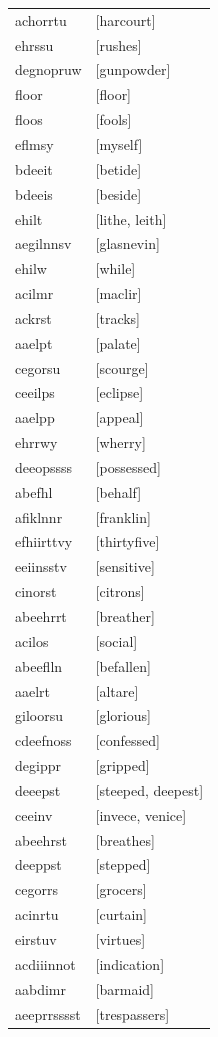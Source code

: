 \documentclass{article}
\begin{document}
\begin{tabular}{ll}
achorrtu & [harcourt] \\
ehrssu & [rushes] \\
degnopruw & [gunpowder] \\
floor & [floor] \\
floos & [fools] \\
eflmsy & [myself] \\
bdeeit & [betide] \\
bdeeis & [beside] \\
ehilt & [lithe, leith] \\
aegilnnsv & [glasnevin] \\
ehilw & [while] \\
acilmr & [maclir] \\
ackrst & [tracks] \\
aaelpt & [palate] \\
cegorsu & [scourge] \\
ceeilps & [eclipse] \\
aaelpp & [appeal] \\
ehrrwy & [wherry] \\
deeopssss & [possessed] \\
abefhl & [behalf] \\
afiklnnr & [franklin] \\
efhiirttvy & [thirtyfive] \\
eeiinsstv & [sensitive] \\
cinorst & [citrons] \\
abeehrrt & [breather] \\
acilos & [social] \\
abeeflln & [befallen] \\
aaelrt & [altare] \\
giloorsu & [glorious] \\
cdeefnoss & [confessed] \\
degippr & [gripped] \\
deeepst & [steeped, deepest] \\
ceeinv & [invece, venice] \\
abeehrst & [breathes] \\
deeppst & [stepped] \\
cegorrs & [grocers] \\
acinrtu & [curtain] \\
eirstuv & [virtues] \\
acdiiinnot & [indication] \\
aabdimr & [barmaid] \\
aeeprrsssst & [trespassers] \\

\end{tabular}
\end{document}
